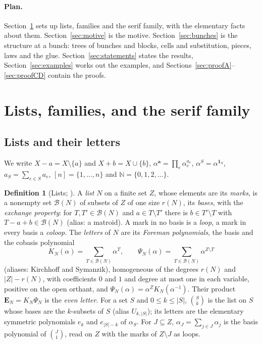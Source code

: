\documentclass[11pt]{article}
\theoremstyle{plain}
\theoremstyle{definition}
\newtheorem{defn}[prop]{Definition}
\theoremstyle{remark}
\newcommand{\cB}{\mathcal B}
\newcommand{\N}{\mathbb N}
\begin{document}
\paragraph{Plan.} Section~\ref{sec:families} sets up lists, families and the serif family, with the elementary facts about them. Section~\ref{sec:motive} is the motive. Section~\ref{sec:bunches} is the structure at a bunch: trees of bunches and blocks, cells and substitution, pieces, laws and the glue. Section~\ref{sec:statements} states the results, Section~\ref{sec:examples} works out the examples, and Sections~\ref{sec:proofA}--\ref{sec:proofCD} contain the proofs.

\section{Lists, families, and the serif family}\label{sec:families}

\subsection{Lists and their letters}

We write $X-a=X\setminus\{a\}$ and $X+b=X\cup\{b\}$, $\alpha^{\mathbf a}=\prod_e\alpha_e^{a_e}$, $\alpha^S=\alpha^{\mathbf 1_S}$, $a_S=\sum_{e\in S}a_e$, $[n]=\{1,\dots,n\}$ and $\N=\{0,1,2,\dots\}$.

\begin{defn}[Lists; {\cite[Def.~7.1, p.~48; Def.~8.17, p.~57]{F}}]\label{def:list}
A \emph{list} $N$ on a finite set $Z$, whose elements are its \emph{marks}, is a nonempty set $\cB(N)$ of subsets of $Z$ of one size $r(N)$, its \emph{bases}, with the \emph{exchange property}: for $T,T'\in\cB(N)$ and $a\in T\setminus T'$ there is $b\in T'\setminus T$ with $T-a+b\in\cB(N)$ (alias: a matroid). A mark in no basis is a \emph{loop}, a mark in every basis a \emph{coloop}. The \emph{letters} of $N$ are its \emph{Foreman polynomials}, the basis and the cobasis polynomial
\[
K_N(\alpha)=\sum_{T\in\cB(N)}\alpha^T,\qquad \Psi_N(\alpha)=\sum_{T\in\cB(N)}\alpha^{Z\setminus T}
\]
(aliases: Kirchhoff and Symanzik), homogeneous of the degrees $r(N)$ and $|Z|-r(N)$, with coefficients $0$ and $1$ and degree at most one in each variable, positive on the open orthant, and $\Psi_N(\alpha)=\alpha^ZK_N(\alpha^{-1})$. Their product $\mathbf E_N=K_N\Psi_N$ is the \emph{even letter}. For a set $S$ and $0\le k\le|S|$, $\binom Sk$ is the list on $S$ whose bases are the $k$-subsets of $S$ (alias $U_{k,|S|}$); its letters are the elementary symmetric polynomials $e_k$ and $e_{|S|-k}$ of $\alpha_S$. For $J\subseteq Z$, $\alpha_J=\sum_{j\in J}\alpha_j$ is the basis polynomial of $\binom J1$, read on $Z$ with the marks of $Z\setminus J$ as loops.
\end{defn}
\end{document}
